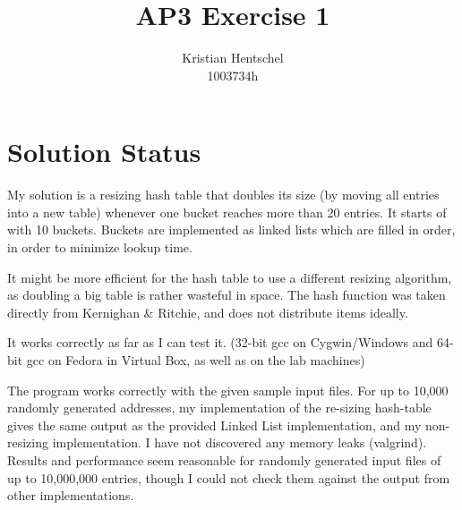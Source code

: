 \documentclass{article}
\title{AP3 Exercise 1}
\author{Kristian Hentschel\\1003734h}
\begin{document}
\maketitle
\section{Solution Status}
My solution is a resizing hash table that doubles its size (by moving all entries into a new table) whenever one bucket reaches more than 20 entries. It starts of with 10 buckets. Buckets are implemented as linked lists which are filled in order, in order to minimize lookup time.

It might be more efficient for the hash table to use a different resizing algorithm, as doubling a big table is rather wasteful in space. The hash function was taken directly from Kernighan \& Ritchie, and does not distribute items ideally.

It works correctly as far as I can test it. (32-bit gcc on Cygwin/Windows and 64-bit gcc on Fedora in Virtual Box, as well as on the lab machines)

The program works correctly with the given sample input files. For up to 10,000 randomly generated addresses, my implementation of the re-sizing hash-table gives the same output as the provided Linked List implementation, and my non-resizing implementation. I have not discovered any memory leaks (valgrind). Results and performance seem reasonable for randomly generated input files of up to 10,000,000 entries, though I could not check them against the output from other implementations.
\end{document}
